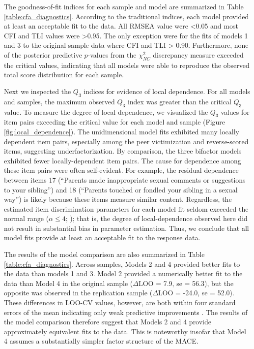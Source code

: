 \documentclass[letterpaper,man,natbib,longtable,floatsintext,12pt]{apa6}
\begin{document}
The goodness-of-fit indices for each sample and model are summarized in Table \ref{table:cfa_diagnostics}. According to the traditional indices, each model provided at least an acceptable fit to the data. All RMSEA value were <0.05 and most CFI and TLI values were >0.95. The only exception were for the fits of models 1 and 3 to the original sample data where CFI and TLI > 0.90. Furthermore, none of the posterior predictive $p$-values from the $\chi^2_{NC}$ discrepancy measure exceeded the critical values, indicating that all models were able to reproduce the observed total score distribution for each sample.

Next we inspected the $Q_3$ indices for evidence of local dependence. For all models and samples, the maximum observed $Q_3$ index was greater than the critical $Q_3$ value. To measure the degree of local dependence, we visualized the $Q_3$ values for item pairs exceeding the critical value for each model and sample (Figure \ref{fig:local_dependence}). The unidimensional model fits exhibited many locally dependent item pairs, especially among the peer victimization and reverse-scored items, suggesting underfactorization. By comparison, the three bifactor models exhibited fewer locally-dependent item pairs. The cause for dependence among these item pairs were often self-evident. For example, the residual dependence between items 17 (``Parents made inappropriate sexual comments or suggestions to your sibling'') and 18 (``Parents touched or fondled your sibling in a sexual way'') is likely because these items measure similar content. Regardless, the estimated item discrimination parameters for each model fit seldom exceeded the normal range ($\alpha \leq 4$; \citealt{edwards2018diagnostic}); that is, the degree of local-dependence observed here did not result in substantial bias in parameter estimation. Thus, we conclude that all model fits provide at least an acceptable fit to the response data.

The results of the model comparison are also summarized in Table \ref{table:cfa_diagnostics}. Across samples, Models 2 and 4 provided better fits to the data than models 1 and 3. Model 2 provided a numerically better fit to the data than Model 4 in the original sample ($\Delta \text{LOO}$ = 7.9, se = 56.3), but the opposite was observed in the replication sample ($\Delta \text{LOO}$ = -24.0, se = 52.0). These differences in LOO-CV values, however, are both within four standard errors of the mean indicating only weak predictive improvements \citep{vehtari2022cv}. The results of the model comparison therefore suggest that Models 2 and 4 provide approximately equivalent fits to the data. This is noteworthy insofar that Model 4 assumes a substantially simpler factor structure of the MACE.
\end{document}
